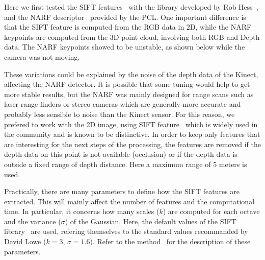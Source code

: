 Here we first tested the \gls{SIFT} features~\cite{lowe_2004_sift} with the library developed by Rob Hess~\cite{hess_sift}, and the \gls{NARF} descriptor~\cite{steder10irosws} provided by the \gls{PCL}. One important difference is that the \gls{SIFT} feature is computed from the RGB data in 2D, while the \gls{NARF} keypoints are computed from the 3D point cloud, involving both RGB and Depth data.
The \gls{NARF} keypoints showed to be unstable, as shown below while the camera was not moving.


These variations could be explained by the noise of the depth data of the Kinect, affecting the \gls{NARF} detector. It is possible that some tuning would help to get more stable results, but the \gls{NARF} was mainly designed for range scans such as laser range finders or stereo cameras which are generally more accurate and probably less sensible to noise than the Kinect sensor. For this reason, we prefered to work with the 2D image, using \gls{SIFT} feature~\cite{lowe_2004_sift} which is widely used in the community and is known to be distinctive. In order to keep only features that are interesting for the next steps of the processing, the features are removed if the depth data on this point is not available (occlusion) or if the depth data is outside a fixed range of depth distance. Here a maximum range of 5 meters is used.

Practically, there are many parameters to define how the \gls{SIFT} features are extracted. This will mainly affect the number of features and the computational time. In particular, it concerns how many scales ($k$) are computed for each octave and the variance ($\sigma$) of the Gaussian. Here, the default values of the \gls{SIFT} library~\cite{hess_sift} are used, refering themselves to the standard values recommanded by David Lowe ($k=3$, $\sigma=1.6$). Refer to the method~\cite{lowe_2004_sift} for the description of these parameters.

